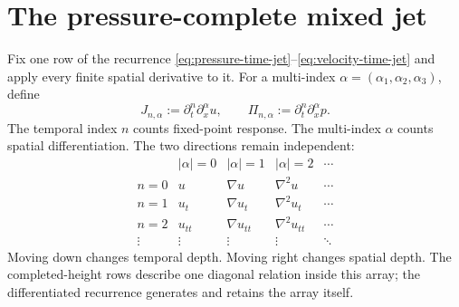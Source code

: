 \section{The pressure-complete mixed jet}

Fix one row of the recurrence
\eqref{eq:pressure-time-jet}--\eqref{eq:velocity-time-jet} and apply every
finite spatial derivative to it.  For a multi-index
\(\alpha=(\alpha_1,\alpha_2,\alpha_3)\), define
\begin{equation*}
 J_{n,\alpha}:=\partial_t^n\partial_x^\alpha u,
 \qquad
 \Pi_{n,\alpha}:=\partial_t^n\partial_x^\alpha p.
\end{equation*}
The temporal index \(n\) counts fixed-point response.  The multi-index
\(\alpha\) counts spatial differentiation.  The two directions remain
independent:
\begin{equation*}
 \begin{array}{c|cccc}
  & |\alpha|=0 & |\alpha|=1 & |\alpha|=2 & \cdots\\
 \hline
  n=0 & u & \nabla u & \nabla^2u & \cdots\\
  n=1 & u_t & \nabla u_t & \nabla^2u_t & \cdots\\
  n=2 & u_{tt} & \nabla u_{tt} & \nabla^2u_{tt} & \cdots\\
  \vdots & \vdots & \vdots & \vdots & \ddots
 \end{array}
\end{equation*}
Moving down changes temporal depth.  Moving right changes spatial depth.  The
completed-height rows describe one diagonal relation inside this array; the
differentiated recurrence generates and retains the array itself.

